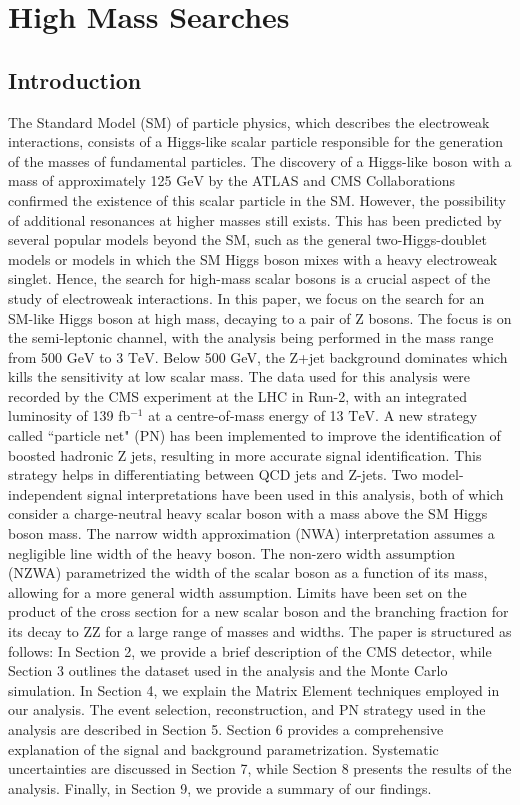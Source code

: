 \chapter{High Mass Searches}
\label{ch:highMassSearches}
\section{Introduction}
The Standard Model (SM) of particle physics, which describes the electroweak interactions, consists of a Higgs-like scalar particle responsible for the generation of the masses of fundamental particles.
The discovery of a Higgs-like boson with a mass of approximately 125 $\textrm{GeV}$ by the ATLAS and CMS Collaborations confirmed the existence of this scalar particle in the SM.
However, the possibility of additional resonances at higher masses still exists.
This has been predicted by several popular models beyond the SM, such as the general two-Higgs-doublet models or models in which the SM Higgs boson mixes with a heavy electroweak singlet. Hence, the search for high-mass scalar bosons is a crucial aspect of the study of electroweak interactions.
In this paper, we focus on the search for an SM-like Higgs boson at high mass, decaying to a pair of Z bosons.
The focus is on the semi-leptonic channel, with the analysis being performed in the mass range from 500 $\textrm{GeV}$ to 3 $\textrm{TeV}$. Below 500 GeV, the Z+jet background dominates which kills the sensitivity at low scalar mass.
The data used for this analysis were recorded by the CMS experiment at the LHC in Run-2, with an integrated luminosity of 139 fb$^{-1}$ at a centre-of-mass energy of 13 $\textrm{TeV}$.
A new strategy called ``particle net" (PN) has been implemented to improve the identification of boosted hadronic Z jets, resulting in more accurate signal identification. This strategy helps in differentiating between QCD jets and Z-jets.
Two model-independent signal interpretations have been used in this analysis, both of which consider a charge-neutral heavy scalar boson with a mass above the SM Higgs boson mass. The narrow width approximation (NWA) interpretation assumes a negligible line width of the heavy boson.
The non-zero width assumption (NZWA) parametrized the width of the scalar boson as a function of its mass, allowing for a more general width assumption.
Limits have been set on the product of the cross section for a new scalar boson and the branching fraction for its decay to ZZ for a large range of masses and widths.
The paper is structured as follows: In Section 2, we provide a brief description of the CMS detector, while Section 3 outlines the dataset used in the analysis and the Monte Carlo simulation. In Section 4, we explain the Matrix Element techniques employed in our analysis. The event selection, reconstruction, and PN strategy used in the analysis are described in Section 5. Section 6 provides a comprehensive explanation of the signal and background parametrization. Systematic uncertainties are discussed in Section 7, while Section 8 presents the results of the analysis. Finally, in Section 9, we provide a summary of our findings.


